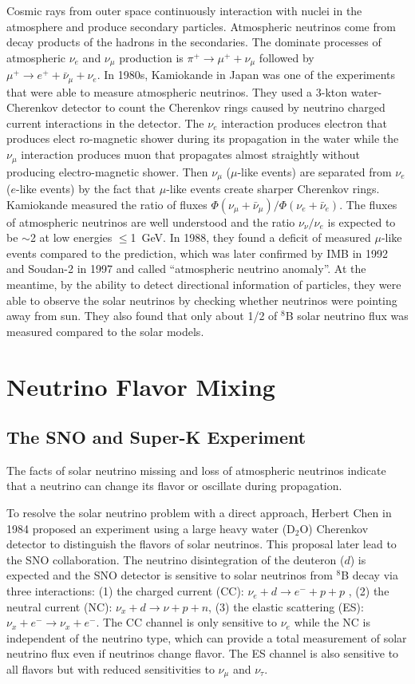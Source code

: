 \documentclass[preprint,12pt]{elsarticle}
\begin{document}
Cosmic rays from outer space continuously interaction with nuclei in the atmosphere and produce secondary particles. Atmospheric neutrinos come from decay products of the hadrons in the secondaries. The dominate processes of atmospheric $\nu_e$ and $\nu_\mu$ production is $\pi^+\to\mu^+ + \nu_\mu$ followed by $\mu^+ \to e^+ + \bar{\nu}_\mu + \nu_e$. In 1980s, Kamiokande in Japan was one of the experiments that were able to measure atmospheric neutrinos. They used a 3-kton water-Cherenkov detector to count the Cherenkov rings caused by neutrino charged current interactions in the detector. The $\nu_e$ interaction produces electron that produces elect
ro-magnetic shower during its propagation in the water while the $\nu_\mu$ interaction produces muon that propagates almost straightly without producing electro-magnetic shower. Then $\nu_\mu$ ($\mu$-like events) are separated from $\nu_e$ ($e$-like events) by the fact that $\mu$-like events create sharper Cherenkov rings. Kamiokande measured the ratio of fluxes $\Phi(\nu_\mu+\bar{\nu}_\mu)/\Phi(\nu_e+\bar{\nu}_e)$. The fluxes of atmospheric neutrinos are well understood and the ratio $\nu_\nu/\nu_e$ is expected to be $\sim$2 at low energies $\leq$1~GeV. In 1988, they found a deficit of measured $\mu$-like events compared to the prediction, which was later confirmed by IMB in 1992\cite{imb} and Soudan-2 in 1997\cite{soudan2} and called ``atmospheric neutrino anomaly''\cite{atmNuReview}. At the meantime, by the ability to detect directional information of particles, they were able to observe the solar neutrinos by checking whether neutrinos were pointing away from sun. They also found that only about 1/2 of $^8$B solar neutrino flux was measured compared to the solar models\cite{kamioII}. 

\section{Neutrino Flavor Mixing}
\subsection{The SNO and Super-K Experiment}
The facts of solar neutrino missing and loss of atmospheric neutrinos indicate that a neutrino can change its flavor or oscillate during propagation.

To resolve the solar neutrino problem with a direct approach, Herbert Chen in 1984 proposed an experiment using a large heavy water (D$_2$O) Cherenkov detector to distinguish the flavors of solar neutrinos\cite{herbertChen}. This proposal later lead to the SNO collaboration. The neutrino disintegration of the deuteron ($d$) is expected and the SNO detector is sensitive to solar neutrinos from $^8$B decay via three interactions: (1) the charged current (CC): $\nu_e+d\to e^-+p+p$ , (2) the neutral current (NC): $\nu_x+d\to\nu+p+n$, (3) the elastic scattering (ES): $\nu_x+e^-\to \nu_x+e^-$. The CC channel is only sensitive to $\nu_e$ while the NC is independent of the neutrino type, which can provide a total measurement of solar neutrino flux even if neutrinos change flavor. The ES channel is also sensitive to all flavors but with reduced sensitivities to $\nu_\mu$ and $\nu_\tau$\cite{SNO}.
\end{document}
